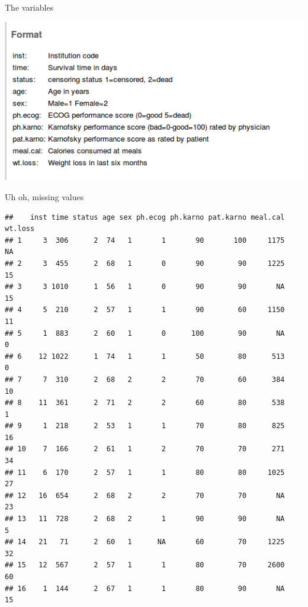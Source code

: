 \documentclass[ignorenonframetext,]{beamer}
\newenvironment{Shaded}{\begin{snugshade}}{\end{snugshade}}
\newcommand{\DecValTok}[1]{\textcolor[rgb]{0.00,0.00,0.81}{#1}}
\newcommand{\KeywordTok}[1]{\textcolor[rgb]{0.13,0.29,0.53}{\textbf{#1}}}
\newcommand{\NormalTok}[1]{#1}
\newcommand{\OperatorTok}[1]{\textcolor[rgb]{0.81,0.36,0.00}{\textbf{#1}}}
\newcommand{\StringTok}[1]{\textcolor[rgb]{0.31,0.60,0.02}{#1}}
\begin{document}
\begin{frame}{The variables}
\protect\hypertarget{the-variables}{}

\includegraphics{lung-cancer-data.png}

\end{frame}

\begin{frame}[fragile]{Uh oh, missing values}
\protect\hypertarget{uh-oh-missing-values}{}

\begin{Shaded}
\end{Shaded}

\begin{verbatim}
##    inst time status age sex ph.ecog ph.karno pat.karno meal.cal wt.loss
## 1     3  306      2  74   1       1       90       100     1175      NA
## 2     3  455      2  68   1       0       90        90     1225      15
## 3     3 1010      1  56   1       0       90        90       NA      15
## 4     5  210      2  57   1       1       90        60     1150      11
## 5     1  883      2  60   1       0      100        90       NA       0
## 6    12 1022      1  74   1       1       50        80      513       0
## 7     7  310      2  68   2       2       70        60      384      10
## 8    11  361      2  71   2       2       60        80      538       1
## 9     1  218      2  53   1       1       70        80      825      16
## 10    7  166      2  61   1       2       70        70      271      34
## 11    6  170      2  57   1       1       80        80     1025      27
## 12   16  654      2  68   2       2       70        70       NA      23
## 13   11  728      2  68   2       1       90        90       NA       5
## 14   21   71      2  60   1      NA       60        70     1225      32
## 15   12  567      2  57   1       1       80        70     2600      60
## 16    1  144      2  67   1       1       80        90       NA      15
\end{verbatim}

\end{frame}
\end{document}
